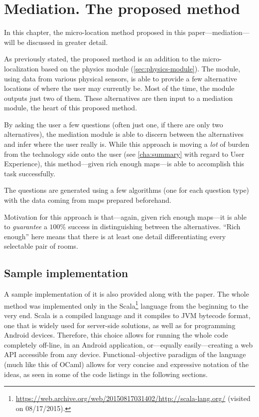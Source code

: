 \chapter{Mediation. The proposed method}
\label{cha:mediation}

In this chapter, the micro-location method proposed in this paper---mediation---will be discussed in greater detail.

As previously stated, the proposed method is an addition to the micro-localization based on the physics module (\cref{sec:physics-module}). The module, using data from various physical sensors, is able to provide a few alternative locations of where the user may currently be. Most of the time, the module outputs just two of them. These alternatives are then input to a mediation module, the heart of this proposed method.

By asking the user a few questions (often just one, if there are only two alternatives), the mediation module is able to discern between the alternatives and infer where the user really is. While this approach is moving a \emph{lot} of burden from the technology side onto the user (see \cref{cha:summary} with regard to User Experience), this method---given rich enough maps---is able to accomplish this task successfully.

The questions are generated using a few algorithms (one for each question type) with the data coming from maps prepared beforehand.

Motivation for this approach is that---again, given rich enough maps---it is able to \emph{guarantee} a $100\%$ success in distinguishing between the alternatives. ``Rich enough'' here means that there is at least one detail differentiating every selectable pair of rooms.

\section{Sample implementation}
\label{sec:sample-implementation}

A sample implementation of it is also provided along with the paper. The whole method was implemented only in the Scala\footnote{\url{https://web.archive.org/web/20150817031402/http://scala-lang.org/} (visited on 08/17/2015).} language from the beginning to the very end. Scala is a compiled language and it compiles to JVM bytecode format, one that is widely used for server-side solutions, as well as for programming Android devices. Therefore, this choice allows for running the whole code completely off-line, in an Android application, or---equally easily---creating a web API accessible from any device. Functional--objective paradigm of the language (much like this of OCaml) allows for very concise and expressive notation of the ideas, as seen in some of the code listings in the following sections.

